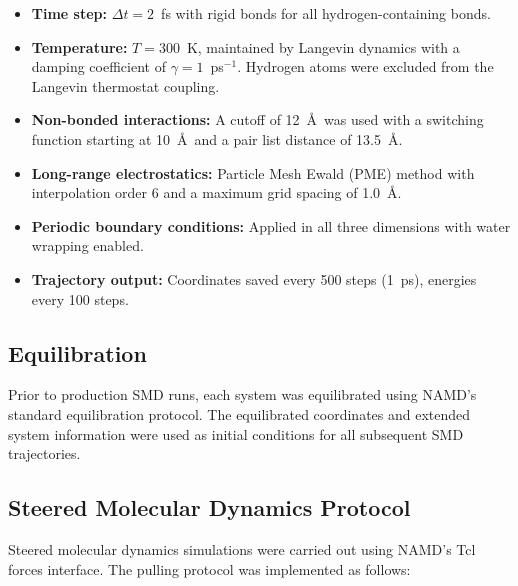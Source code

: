 \documentclass[12pt]{article}
\begin{document}
\begin{itemize}
    \item \textbf{Time step:} $\Delta t = 2$~fs with rigid bonds for all hydrogen-containing bonds.
    \item \textbf{Temperature:} $T = 300$~K, maintained by Langevin dynamics with a damping coefficient of $\gamma = 1$~ps$^{-1}$. Hydrogen atoms were excluded from the Langevin thermostat coupling.
    \item \textbf{Non-bonded interactions:} A cutoff of 12~\AA\ was used with a switching function starting at 10~\AA\ and a pair list distance of 13.5~\AA.
    \item \textbf{Long-range electrostatics:} Particle Mesh Ewald (PME) method with interpolation order 6 and a maximum grid spacing of 1.0~\AA.
    \item \textbf{Periodic boundary conditions:} Applied in all three dimensions with water wrapping enabled.
    \item \textbf{Trajectory output:} Coordinates saved every 500 steps (1~ps), energies every 100 steps.
\end{itemize}

\subsection{Equilibration}

Prior to production SMD runs, each system was equilibrated using NAMD's standard equilibration protocol. The equilibrated coordinates and extended system information were used as initial conditions for all subsequent SMD trajectories.

\subsection{Steered Molecular Dynamics Protocol}

Steered molecular dynamics simulations were carried out using NAMD's Tcl forces interface. The pulling protocol was implemented as follows:
\end{document}
